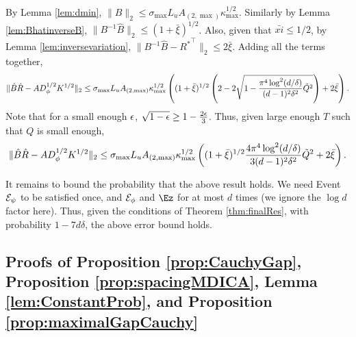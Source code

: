 By Lemma \ref{lem:dmin}, 
 $ \|B\|_2 \le \sigma_{\max}L_uA_{(2,\max)}\kappa_{\max}^{1/2}$. 
Similarly by Lemma \ref{lem:BhatinverseB}, $\| B^{-1}\hat{B}\|_2 \le (1+\bar{\xi})^{1/2}$. 
Also, given that $\bar{xi} \le 1/2$, by Lemma \ref{lem:inversevariation}, $\|B^{-1}\hat{B} -{R^*}^{\top}\|_2 \le 2\bar{\xi}$.
Adding all the terms together,
\[
\| \hat{B}\hat{R} - AD_{\phi}^{1/2}K^{1/2}\|_2 \le \sigma_{\max}L_uA_{(2,\max)}\kappa_{\max}^{1/2}\left((1+\bar{\xi})^{1/2}\left(  2 - 2\sqrt{1-\frac{\pi^4 \log^2(d/\delta)}{(d-1)^2\delta^2} \tilde{Q}^2}\right) + 2\bar{\xi}\right).
\] 
Note that for a small enough $\epsilon$, $\sqrt{1-\epsilon} \ge 1-\frac{2\epsilon}{3}$. Thus, given large enough $T$ such that $Q$ is small enough,
\[
\| \hat{B}\hat{R} - AD_{\phi}^{1/2}K^{1/2}\|_2 \le \sigma_{\max}L_uA_{(2,\max)}\kappa_{\max}^{1/2}\left((1+\bar{\xi})^{1/2}\frac{4\pi^4 \log^2(d/\delta)}{3(d-1)^2\delta^2} \tilde{Q}^2+ 2\bar{\xi}\right).
\]

It remains to bound the probability that the above result holds.
We need Event $\mathcal{E}_{\psi}$ to be satisfied once, and $\mathcal{E}_{\phi}$ and $\Ez$ for at most $d$ times (we ignore the $\log d$ factor here). 
Thus, given the conditions of Theorem \ref{thm:finalRes}, with probability $1-7d\delta$, the above error bound holds. 

\subsection{Proofs of Proposition \ref{prop:CauchyGap}, Proposition \ref{prop:spacingMDICA}, Lemma \ref{lem:ConstantProb}, and Proposition \ref{prop:maximalGapCauchy}}
\label{sec:events}

